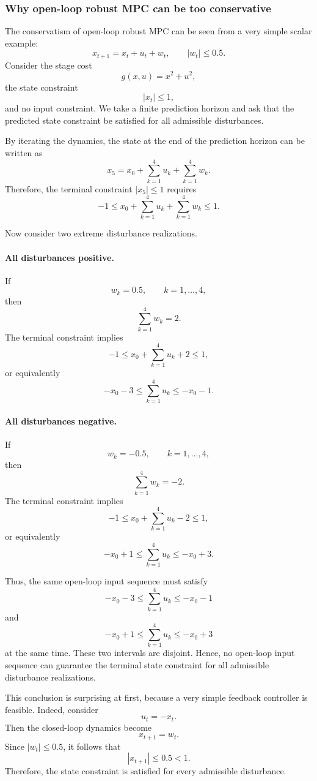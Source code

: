 \subsubsection{Why open-loop robust MPC can be too conservative}

The conservatism of open-loop robust MPC can be seen from a very simple scalar example:
\[
x_{t+1}=x_t+u_t+w_t,
\qquad |w_t|\le 0.5.
\]
Consider the stage cost
\[
g(x,u)=x^2+u^2,
\]
the state constraint
\[
|x_t|\le 1,
\]
and no input constraint. We take a finite prediction horizon and ask that the predicted state
constraint be satisfied for all admissible disturbances.

By iterating the dynamics, the state at the end of the prediction horizon can be written as
\[
x_5 = x_0+\sum_{k=1}^{4}u_k+\sum_{k=1}^{4}w_k.
\]
Therefore, the terminal constraint $|x_5|\le 1$ requires
\[
-1 \le x_0+\sum_{k=1}^{4}u_k+\sum_{k=1}^{4}w_k \le 1.
\]

Now consider two extreme disturbance realizations.

\paragraph{All disturbances positive.}
If
\[
w_k=0.5,\qquad k=1,\dots,4,
\]
then
\[
\sum_{k=1}^{4}w_k=2.
\]
The terminal constraint implies
\[
-1 \le x_0+\sum_{k=1}^{4}u_k+2 \le 1,
\]
or equivalently
\[
-x_0-3 \le \sum_{k=1}^{4}u_k \le -x_0-1.
\]

\paragraph{All disturbances negative.}
If
\[
w_k=-0.5,\qquad k=1,\dots,4,
\]
then
\[
\sum_{k=1}^{4}w_k=-2.
\]
The terminal constraint implies
\[
-1 \le x_0+\sum_{k=1}^{4}u_k-2 \le 1,
\]
or equivalently
\[
-x_0+1 \le \sum_{k=1}^{4}u_k \le -x_0+3.
\]

Thus, the same open-loop input sequence must satisfy
\[
-x_0-3 \le \sum_{k=1}^{4}u_k \le -x_0-1
\]
and
\[
-x_0+1 \le \sum_{k=1}^{4}u_k \le -x_0+3
\]
at the same time. These two intervals are disjoint. Hence, no open-loop input sequence can
guarantee the terminal state constraint for all admissible disturbance realizations.

This conclusion is surprising at first, because a very simple feedback controller is feasible.
Indeed, consider
\[
u_t=-x_t.
\]
Then the closed-loop dynamics become
\[
x_{t+1}=w_t.
\]
Since $|w_t|\le 0.5$, it follows that
\[
|x_{t+1}|\le 0.5 < 1.
\]
Therefore, the state constraint is satisfied for every admissible disturbance.

